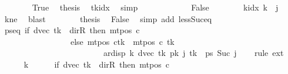 \begin{isabellebody}
\ \ \ \ \ \ \isamarkupfalse%
\ True\ \isamarkupfalse%
\ {\isacharquery}{\kern0pt}thesis\ \isamarkupfalse%
\ tkidx\ \isamarkupfalse%
\ simp\isanewline
\ \ \ \ \isamarkupfalse%
\isanewline
\ \ \ \ \ \ \isamarkupfalse%
\ False\isanewline
\ \ \ \ \ \ \isamarkupfalse%
\ {\isachardoublequoteopen}k{\isacharunderscore}{\kern0pt}idx\ k\ {\isasymnoteq}\ j{\isachardoublequoteclose}\ \isamarkupfalse%
\ kne\ \isamarkupfalse%
\ blast\isanewline
\ \ \ \ \ \ \isamarkupfalse%
\ {\isacharquery}{\kern0pt}thesis\ \isamarkupfalse%
\ False\ \isamarkupfalse%
\ {\isacharparenleft}{\kern0pt}simp\ add{\isacharcolon}{\kern0pt}\ less{\isacharunderscore}{\kern0pt}Suc{\isacharunderscore}{\kern0pt}eq{\isacharparenright}{\kern0pt}\isanewline
\ \ \ \ \isamarkupfalse%
\isanewline
\ \ \isamarkupfalse%
\isanewline
\ \ \isamarkupfalse%
\ ps{\isacharunderscore}{\kern0pt}eq{\isacharcolon}{\kern0pt}\ {\isachardoublequoteopen}{\isacharparenleft}{\kern0pt}if\ dvec\ {\isacharquery}{\kern0pt}tk\ {\isacharequal}{\kern0pt}\ dir{\isachardot}{\kern0pt}R\ then\ mt{\isacharunderscore}{\kern0pt}pos\ c\isanewline
\ \ \ \ \ \ \ \ \ \ \ \ \ \ \ \ \ else\ {\isacharparenleft}{\kern0pt}mt{\isacharunderscore}{\kern0pt}pos\ c{\isacharparenright}{\kern0pt}{\isacharparenleft}{\kern0pt}{\isacharquery}{\kern0pt}tk\ {\isacharcolon}{\kern0pt}{\isacharequal}{\kern0pt}\ mt{\isacharunderscore}{\kern0pt}pos\ c\ {\isacharquery}{\kern0pt}tk\isanewline
\ \ \ \ \ \ \ \ \ \ \ \ \ \ \ \ \ \ \ \ \ \ \ \ {\isacharminus}{\kern0pt}\ ar{\isacharunderscore}{\kern0pt}disp\ {\isacharquery}{\kern0pt}k\ {\isacharparenleft}{\kern0pt}dvec\ {\isacharquery}{\kern0pt}tk{\isacharparenright}{\kern0pt}\ {\isacharparenleft}{\kern0pt}{\isacharquery}{\kern0pt}pk\ j\ {\isacharquery}{\kern0pt}tk{\isacharparenright}{\kern0pt}{\isacharparenright}{\kern0pt}{\isacharparenright}{\kern0pt}\ {\isacharequal}{\kern0pt}\ {\isacharquery}{\kern0pt}ps\ {\isacharparenleft}{\kern0pt}Suc\ j{\isacharparenright}{\kern0pt}{\isachardoublequoteclose}\isanewline
\ \ \isamarkupfalse%
\ {\isacharparenleft}{\kern0pt}rule\ ext{\isacharparenright}{\kern0pt}\isanewline
\ \ \ \ \isamarkupfalse%
\ k\isanewline
\ \ \ \ \isamarkupfalse%
\ {\isachardoublequoteopen}{\isacharparenleft}{\kern0pt}if\ dvec\ {\isacharquery}{\kern0pt}tk\ {\isacharequal}{\kern0pt}\ dir{\isachardot}{\kern0pt}R\ then\ mt{\isacharunderscore}{\kern0pt}pos\ c\isanewline

\end{isabellebody}
